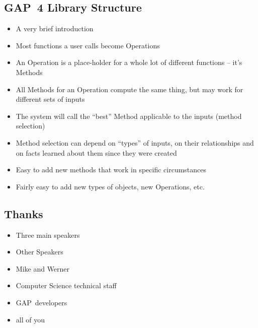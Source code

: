 \documentclass[11pt]{article}
\def\bs{\begin{slide}}
\def\es{\end{slide}}
\def\bi{\begin{itemize}}
\def\ei{\end{itemize}}
\def\GAP{\textsf{GAP}}
\begin{document}
\begin{slide}
\subsection{\GAP\ 4 Library Structure}
\bi
\item A very brief introduction
\item Most functions a user calls become Operations
\item An Operation is a place-holder for a whole lot of different
functions -- it's Methods
\item All Methods for an Operation compute the same thing, but may
work for different sets of inputs
\item The system will call the ``best'' Method applicable to the
inputs (method selection)
\item Method selection can depend on ``types'' of inputs, on their
relationships and on facts learned about them since they were created
\item Easy to add new methods that work in specific circumstances
\item Fairly easy to add new types of objects, new Operations, etc.
\ei
\es
\bs
\subsection{Thanks}
\bi
\item Three main speakers
\item Other Speakers
\item Mike and Werner
\item Computer Science technical staff
\item \GAP\ developers
\item all of you
\ei
\es
\end{document}
